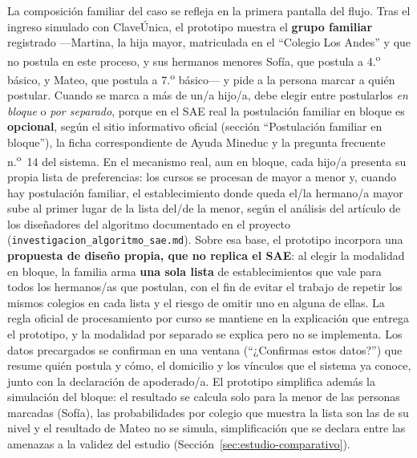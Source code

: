 La composición familiar del caso se refleja en la primera pantalla del flujo. Tras el ingreso simulado con ClaveÚnica, el prototipo muestra el \textbf{grupo familiar} registrado ---Martina, la hija mayor, matriculada en el ``Colegio Los Andes'' y que no postula en este proceso, y sus hermanos menores Sofía, que postula a 4.\textsuperscript{o} básico, y Mateo, que postula a 7.\textsuperscript{o} básico--- y pide a la persona marcar a quién postular. Cuando se marca a más de un/a hijo/a, debe elegir entre postularlos \emph{en bloque} o \emph{por separado}, porque en el SAE real la postulación familiar en bloque es \textbf{opcional}, según el sitio informativo oficial (sección ``Postulación familiar en bloque''), la ficha correspondiente de Ayuda Mineduc y la pregunta frecuente n.\textsuperscript{o}~14 del sistema. En el mecanismo real, aun en bloque, cada hijo/a presenta su propia lista de preferencias: los cursos se procesan de mayor a menor y, cuando hay postulación familiar, el establecimiento donde queda el/la hermano/a mayor sube al primer lugar de la lista del/de la menor, según el análisis del artículo de los diseñadores del algoritmo documentado en el proyecto (\texttt{investigacion\_algoritmo\_sae.md}). Sobre esa base, el prototipo incorpora una \textbf{propuesta de diseño propia, que no replica el SAE}: al elegir la modalidad en bloque, la familia arma \textbf{una sola lista} de establecimientos que vale para todos los hermanos/as que postulan, con el fin de evitar el trabajo de repetir los mismos colegios en cada lista y el riesgo de omitir uno en alguna de ellas. La regla oficial de procesamiento por curso se mantiene en la explicación que entrega el prototipo, y la modalidad por separado se explica pero no se implementa. Los datos precargados se confirman en una ventana (``¿Confirmas estos datos?'') que resume quién postula y cómo, el domicilio y los vínculos que el sistema ya conoce, junto con la declaración de apoderado/a. El prototipo simplifica además la simulación del bloque: el resultado se calcula solo para la menor de las personas marcadas (Sofía), las probabilidades por colegio que muestra la lista son las de su nivel y el resultado de Mateo no se simula, simplificación que se declara entre las amenazas a la validez del estudio (Sección~\ref{sec:estudio-comparativo}).

